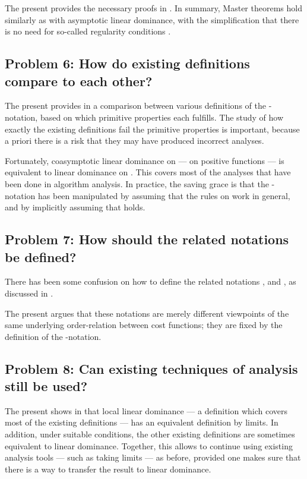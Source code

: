 \documentclass[b5paper, english, oneside]{memoir}
\begin{document}
The present \manuscript{} provides the necessary proofs in . In summary, Master theorems hold similarly as with asymptotic linear dominance, with the simplification that there is no need for so-called regularity conditions \cite{IntroAlgo2009}.

\subsection{Problem 6: How do existing definitions compare to each other?}

The present \manuscript{} provides in  a comparison between various definitions of the -notation, based on which primitive properties each fulfills. The study of how exactly the existing definitions fail the primitive properties is important, because a priori there is a risk that they may have produced incorrect analyses. 

Fortunately, coasymptotic linear dominance on  --- on positive functions --- is equivalent to linear dominance on . This covers most of the analyses that have been done in algorithm analysis. In practice, the saving grace is that the -notation has been manipulated by assuming that the rules on  work in general, and by implicitly assuming that  holds. 

\subsection{Problem 7: How should the related notations be defined?}

There has been some confusion on how to define the related notations , and , as discussed in . 

The present \manuscript{} argues that these notations are merely different viewpoints of the same underlying order-relation between cost functions; they are fixed by the definition of the -notation.

\subsection{Problem 8: Can existing techniques of analysis still be used?}

The present \manuscript{} shows in  that local linear dominance --- a definition which covers most of the existing definitions  --- has an equivalent definition by limits. In addition, under suitable conditions, the other existing definitions are sometimes equivalent to linear dominance. Together, this allows to continue using existing analysis tools --- such as taking limits --- as before, provided one makes sure that there is a way to transfer the result to linear dominance.
\end{document}

